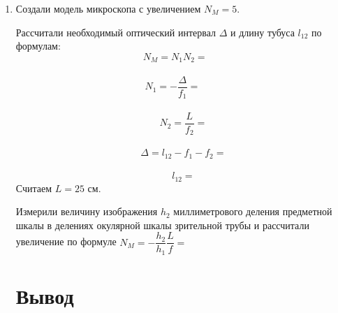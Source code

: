 \documentclass{letask}
\begin{document}
\begin{enumerate}
\item Создали модель микроскопа с увеличением $N_M = 5$.

Рассчитали необходимый оптический интервал $\Delta$ и длину тубуса $l_{12}$  по формулам:\\
\[N_M = N_1N_2=\;\;\;\; \;\;\]
\vspace{0cm}\\
\[N_1 = - \dfrac{\Delta}{f_1}=\;\;\;\;\;\;\;\;\]
\vspace{0cm}\\
\[N_2 = \dfrac{L}{f_2} = \]
\vspace{0cm}\\
\[\Delta = l_{12} - f_1 - f_2 = \]
\vspace{0cm}\\
\[l_{12}=\]
Считаем $L=25$ см.

Измерили величину изображения $h_2$ миллиметрового деления предметной шкалы в делениях окулярной шкалы зрительной трубы и рассчитали увеличение по формуле $N_M = - \dfrac{h_2}{h_1} \dfrac{L}{f} = $

\section{Вывод}

\end{enumerate}
\end{document}
